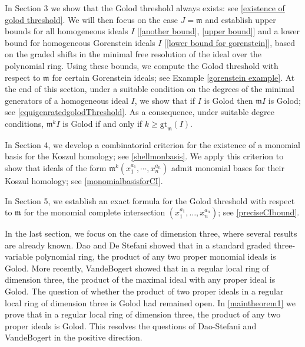 \documentclass[10pt,reqno]{amsart}
\theoremstyle{definition}
\theoremstyle{remark}
\numberwithin{equation}{section}
\newcommand{\m}{\mathfrak m}
\numberwithin{equation}{section}
\begin{document}
In Section 3 we show that the Golod threshold always exists: see \cref{existence of golod threshold}. We will then focus on the case $J=\m$ and establish upper bounds for all homogeneous ideals $I$ [\ref{another bound}, \ref{upper bound}] and a lower bound for homogeneous Gorenstein ideals $I$ [\ref{lower bound for gorenstein}], based on the graded shifts in the minimal free resolution of the ideal over the polynomial ring. Using these bounds, we compute the Golod threshold with respect to $\m$ for certain Gorenstein ideals; see Example \ref{gorenstein example}. At the end of this section, under a suitable condition on the degrees of the minimal generators of a homogeneous ideal $I$, we show that if $I$ is Golod then $\m I$ is Golod; see \cref{equigenratedgolodThreshold}. As a consequence, under suitable degree conditions, $\m^k I$ is Golod if and only if $k\geq \mathrm{gt}_{\m}(I)$.  

In Section 4, we develop a combinatorial criterion for the existence of a monomial basis for the Koszul homology; see \cref{shellmonbasis}. We apply this criterion to show that ideals of the form $\m^k (x_1^{a_1},\cdots,x_n^{a_n})$ admit monomial bases for their Koszul homology; see \cref{monomialbasisforCI}. 

In Section 5, we establish an exact formula for the Golod threshold with respect to $\m$ for the monomial complete intersection $(x_1^{a_1},\ldots,x_n^{a_n})$; see \cref{preciseCIbound}. 



In the last section, we focus on the case of dimension three, where several results are already known. Dao and De Stefani \cite{dao2022monomial} showed that in a standard graded three-variable polynomial ring, the product of any two proper monomial ideals is Golod. More recently, VandeBogert \cite{vandebogert2022products} showed that in a regular local ring of dimension three, the product of the maximal ideal with any proper ideal is Golod. The question of whether the product of two proper ideals in a regular local ring of dimension three is Golod had remained open. In \cref{maintheorem1} we prove that in a regular local ring of dimension three, the product of any two proper ideals is Golod. This resolves the questions of Dao-Stefani\cite[Question 4.5]{dao2022monomial} and VandeBogert\cite[Question 4.11]{vandebogert2022products} in the positive direction. 
\end{document}
